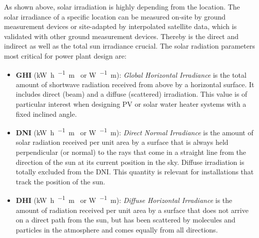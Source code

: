 As shown above, solar irradiation is highly depending from the location. The solar irradiance of a specific location can be measured on-site by ground measurement devices or site-adapted by interpolated satellite data, which is validated with other ground measurement devices. Thereby is the direct and indirect as well as the total sun irradiance crucial.
The solar radiation parameters most critical for power plant design are:
\begin{itemize}
\item \textbf{GHI} (\si{\kilo\watt\hour\per\squared\metre\year} or \si{\watt\per\squared\metre}): \emph{Global Horizontal Irradiance} is the total amount of shortwave radiation received from above by a horizontal surface. It includes direct (beam) and a diffuse (scattered) irradiation. This value is of particular interest when designing PV or solar water heater systems with a fixed inclined angle.
\item \textbf{DNI} (\si{\kilo\watt\hour\per\squared\metre\year} or \si{\watt\per\squared\metre}): \emph{Direct Normal Irradiance} is the amount of solar radiation received per unit area by a surface that is always held perpendicular (or normal) to the rays that come in a straight line from the direction of the sun at its current position in the sky. Diffuse irradiation is totally excluded from the DNI. This quantity is relevant for installations that track the position of the sun.
\item \textbf{DHI} (\si{\kilo\watt\hour\per\squared\metre\year} or \si{\watt\per\squared\metre}): \emph{Diffuse Horizontal Irradiance} is the amount of radiation received per unit area by a surface that does not arrive on a direct path from the sun, but has been scattered by molecules and particles in the atmosphere and comes equally from all directions.
\end{itemize}
